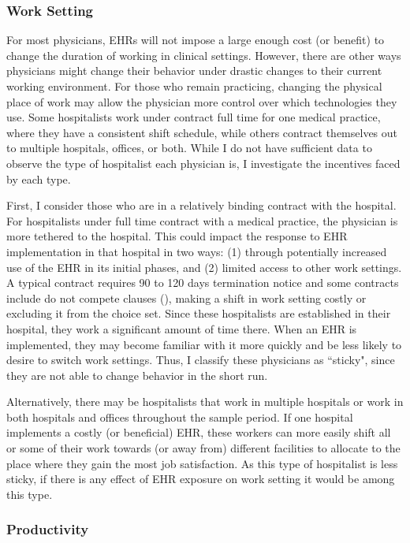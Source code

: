 \documentclass[12pt]{article}
\begin{document}
\subsubsection{Work Setting}

For most physicians, EHRs will not impose a large enough cost (or benefit) to change the duration of working in clinical settings. However, there are other ways physicians might change their behavior under drastic changes to their current working environment. For those who remain practicing, changing the physical place of work may allow the physician more control over which technologies they use. Some hospitalists work under contract full time for one medical practice, where they have a consistent shift schedule, while others contract themselves out to multiple hospitals, offices, or both. While I do not have sufficient data to observe the type of hospitalist each physician is, I investigate the incentives faced by each type.

First, I consider those who are in a relatively binding contract with the hospital. For hospitalists under full time contract with a medical practice, the physician is more tethered to the hospital. This could impact the response to EHR implementation in that hospital in two ways: (1) through potentially increased use of the EHR in its initial phases, and (2) limited access to other work settings. A typical contract requires 90 to 120 days termination notice and some contracts include do not compete clauses (\cite{yasgur_by_-_yasgur_2016}), making a shift in work setting costly or excluding it from the choice set. Since these hospitalists are established in their hospital, they work a significant amount of time there. When an EHR is implemented, they may become familiar with it more quickly and be less likely to desire to switch work settings. Thus, I classify these physicians as ``sticky", since they are not able to change behavior in the short run.

Alternatively, there may be hospitalists that work in multiple hospitals or work in both hospitals and offices throughout the sample period. If one hospital implements a costly (or beneficial) EHR, these workers can more easily shift all or some of their work towards (or away from) different facilities to allocate to the place where they gain the most job satisfaction. As this type of hospitalist is less sticky, if there is any effect of EHR exposure on work setting it would be among this type. 


\subsubsection{Productivity}
\end{document}
